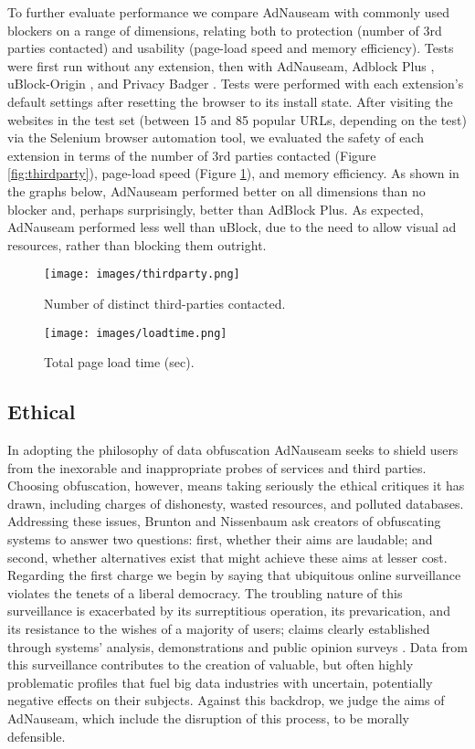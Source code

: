 \documentclass[conference]{IEEEtran}
\begin{document}
To further evaluate performance we compare AdNauseam with commonly used blockers on a range of dimensions, relating both to protection (number of 3rd parties contacted) and usability (page-load speed and memory efficiency). Tests were first run without any extension, then with AdNauseam, Adblock Plus \cite{AdBlock}, uBlock-Origin \cite{Gorhill}, and Privacy Badger \cite{EFF-0}. Tests were performed with each extension's default settings after resetting the browser to its install state. After visiting the websites in the test set (between 15 and 85 popular URLs, depending on the test) via the Selenium browser automation tool, we evaluated the safety of each extension in terms of the number of 3rd parties contacted (Figure \ref{fig:thirdparty}), page-load speed (Figure \ref{fig:loadtime}), and memory efficiency. As shown in the graphs below, AdNauseam performed better on all dimensions than no blocker and, perhaps surprisingly, better than AdBlock Plus. As expected, AdNauseam performed less well than uBlock, due to the need to allow visual ad resources, rather than blocking them outright.

\begin{figure}[!t]
\centering
\texttt{[image: images/thirdparty.png]}
\caption{Number of distinct third-parties contacted.}
\label{fig:thirdparty}
\vspace{2mm}
\texttt{[image: images/loadtime.png]}
\caption{Total page load time (sec).}
\label{fig:loadtime}
\end{figure}


\subsection{Ethical}

In adopting the philosophy of data obfuscation AdNauseam seeks to shield users from the inexorable and inappropriate probes of services and third parties. Choosing obfuscation, however, means taking seriously the ethical critiques it has drawn, including charges of dishonesty, wasted resources, and polluted databases. Addressing these issues, Brunton and Nissenbaum \cite{Brunton} ask creators of obfuscating systems to answer two questions: first, whether their aims are laudable; and second, whether alternatives exist that might achieve these aims at lesser cost. Regarding the first charge we begin by saying that ubiquitous online surveillance violates the tenets of a liberal democracy. The troubling nature of this surveillance is exacerbated by its surreptitious operation, its prevarication, and its resistance to the wishes of a majority of users; claims clearly established through systems' analysis, demonstrations and public opinion surveys \cite{Turow, Goldfarb, Tucker}. Data from this surveillance contributes to the creation of valuable, but often highly problematic profiles that fuel big data industries with uncertain, potentially negative effects on their subjects. Against this backdrop, we judge the aims of AdNauseam, which include the disruption of this process, to be morally defensible.
\end{document}
